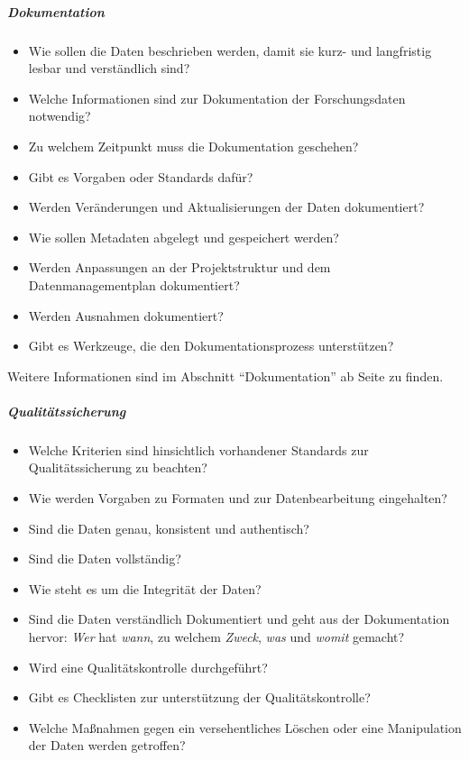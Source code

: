 \subparagraph{Dokumentation}
\begin{itemize}
    \item Wie sollen die Daten beschrieben werden, damit sie kurz- und langfristig lesbar und verständlich sind?
    \item Welche Informationen sind zur Dokumentation der Forschungsdaten notwendig?
    \item Zu welchem Zeitpunkt muss die Dokumentation geschehen?
    \item Gibt es Vorgaben oder Standards dafür?
    \item Werden Veränderungen und Aktualisierungen der Daten dokumentiert?
    \item Wie sollen Metadaten abgelegt und gespeichert werden?
    \item Werden Anpassungen an der Projektstruktur und dem Datenmanagementplan dokumentiert?
    \item Werden Ausnahmen dokumentiert?
    \item Gibt es Werkzeuge, die den Dokumentationsprozess unterstützen?
\end{itemize}
Weitere Informationen sind im Abschnitt "`Dokumentation"' ab Seite \pageref{Metadaten-allgemein} zu finden.

\subparagraph{Qualitätssicherung}
\begin{itemize}
    \item Welche Kriterien sind hinsichtlich vorhandener Standards zur Qualitätssicherung zu beachten?
    \item Wie werden Vorgaben zu Formaten und zur Datenbearbeitung eingehalten?
    \item Sind die Daten genau, konsistent und authentisch?
    \item Sind die Daten vollständig?
    \item Wie steht es um die Integrität der Daten?
    \item Sind die Daten verständlich Dokumentiert und geht aus der Dokumentation hervor: \emph{Wer} hat \emph{wann}, zu welchem \emph{Zweck}, \emph{was} und \emph{womit} gemacht?
    \item Wird eine Qualitätskontrolle durchgeführt?
    \item Gibt es Checklisten zur unterstützung der Qualitätskontrolle?
    \item Welche Maßnahmen gegen ein versehentliches Löschen oder eine Manipulation der Daten werden getroffen?
\end{itemize}

